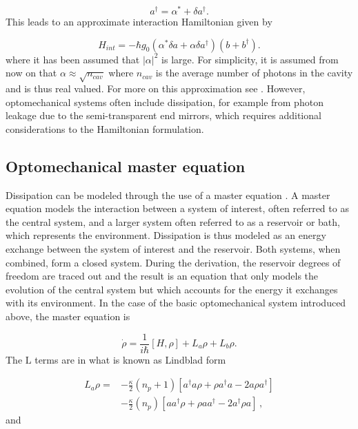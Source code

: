 \documentclass[12pt]{article}
\begin{document}
\begin{equation}
    a^\dagger = \alpha^* + \delta a^\dagger.
\end{equation} This leads to an approximate interaction Hamiltonian given by

\begin{equation}
    H_{int} = -\hbar g_0 (\alpha^* \delta a + \alpha \delta a^\dagger)(b+b^\dagger).
\end{equation} where it has been assumed that $|\alpha|^2$ is large. For simplicity, it is assumed from now on that $\alpha \approx \sqrt{n_{cav}}$ where $n_{cav}$ is the average number of photons in the cavity and is thus real valued. For more on this approximation see \cite{AspelmeyerOptomechanics2014}. However, optomechanical systems often include dissipation, for example from photon leakage due to the semi-transparent end mirrors, which requires additional considerations to the Hamiltonian formulation.

\subsection{Optomechanical master equation}

Dissipation can be modeled through the use of a master equation \cite{CarmichaelQuantumOptics1999}. A master equation models the interaction between a system of interest, often referred to as the central system, and a larger system often referred to as a reservoir or bath, which represents the environment. Dissipation is thus modeled as an energy exchange between the system of interest and the reservoir. Both systems, when combined, form a closed system. During the derivation, the reservoir degrees of freedom are traced out and the result is an equation that only models the evolution of the central system but which accounts for the energy it exchanges with its environment. In the case of the basic optomechanical system introduced above, the master equation is

\begin{equation} \label{eq:OptoMechanicalMasterEquation}
\dot{\rho} = \frac{1}{i\hbar}[H,\rho] +L_a\rho + L_b \rho.
\end{equation} The $\mathrm{L}$ terms are in what is known as Lindblad form 

\begin{align}
L_a \rho =& - \frac{\kappa}{2}(n_p + 1)[a^\dagger a\rho + \rho a^\dagger a -2a\rho a^\dagger]  \\
 &- \frac{\kappa}{2}(n_p)[ aa^\dagger\rho + \rho  aa^\dagger -2a^\dagger\rho a]\, ,\nonumber
\end{align} and
\end{document}

